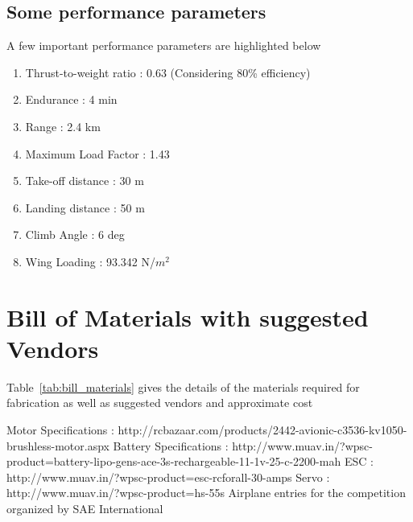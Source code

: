 \documentclass[a4paper,10pt]{article}
\begin{document}
\subsection{Some performance parameters}
A few important performance parameters are highlighted below
\begin{enumerate}
\item Thrust-to-weight ratio : 0.63 (Considering 80\% efficiency)
\item Endurance : 4 min
\item Range : 2.4 km
\item Maximum Load Factor : 1.43
\item Take-off distance : 30 m
\item Landing distance : 50 m
\item Climb Angle : 6 deg
\item Wing Loading : 93.342 N/$m^2$
\end{enumerate}

\section{Bill of Materials with suggested Vendors}
Table~\ref{tab:bill_materials} gives the details of the materials required for fabrication as well as suggested vendors and approximate cost
\begin{table}[H]
\centering
{}
\caption{Aircraft cost estimation}
\label{tab:bill_materials}
\end{table}
%
\begin{thebibliography}{10}

   Motor Specifications : http://rcbazaar.com/products/2442-avionic-c3536-kv1050-brushless-motor.aspx
   Battery Specifications : http://www.muav.in/?wpsc-product=battery-lipo-gens-ace-3s-rechargeable-11-1v-25-c-2200-mah
   ESC : http://www.muav.in/?wpsc-product=esc-rcforall-30-amps
   Servo : http://www.muav.in/?wpsc-product=hs-55s
   Airplane entries for the competition organized by SAE International

\end{thebibliography}
\end{document}
